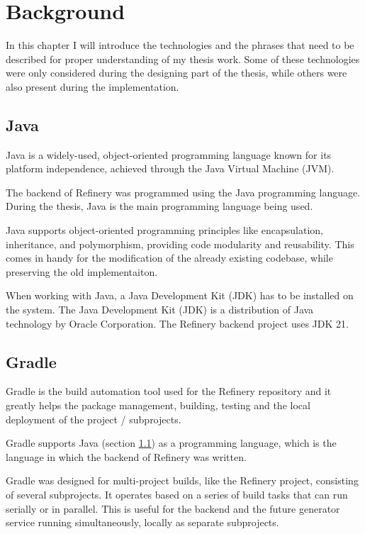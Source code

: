 \chapter{Background} \label{Background}
In this chapter I will introduce the technologies and the phrases that need to be described for proper understanding of my thesis work.
Some of these technologies were only considered during the designing part of the thesis, while others were also present 
during the implementation.

\section{Java} \label{backgrjava}
	Java \cite{java} is a widely-used, object-oriented programming language known for its platform independence, 
	achieved through the Java Virtual Machine (JVM). 

	The backend of Refinery was programmed using the Java programming language. 
	During the thesis, Java is the main programming language being used.

	Java supports object-oriented programming principles like encapsulation, inheritance, and polymorphism, 
	providing code modularity and reusability.
	This comes in handy for the modification of the already existing codebase, while preserving the old implementaiton.

	When working with Java, a Java Development Kit (JDK) has to be installed on the system.
	The Java Development Kit (JDK) is a distribution of Java technology by Oracle Corporation. 
	The Refinery backend project uses JDK 21.

\section{Gradle} \label{backgrgradle}
	Gradle \cite{gradle} is the build automation tool used for the Refinery repository and it greatly helps the package management, 
	building, testing and the local deployment of the project / subprojects.

	Gradle supports Java (section \ref{backgrjava}) as a programming language, which is the language in which the backend of Refinery was written.

	Gradle was designed for multi-project builds, like the Refinery project, consisting of several subprojects. 
	It operates based on a series of build tasks that can run serially or in parallel. 
	This is useful for the backend and the future generator service 
	running simultaneously, locally as separate subprojects.

